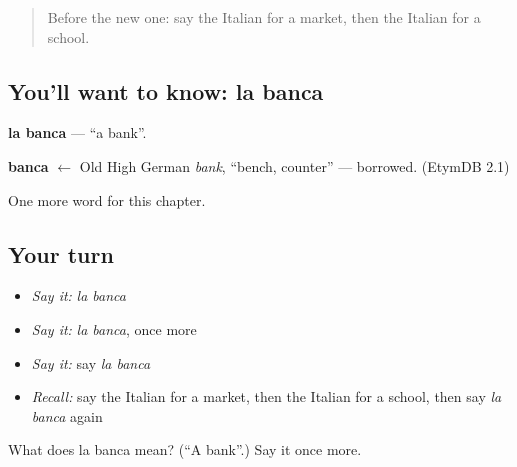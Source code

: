 \begin{quote}
Before the new one: say the Italian for a market, then the Italian for a school.
\end{quote}

\subsection*{You'll want to know: la banca}
\textbf{la banca} — \textquotedblleft{}a bank\textquotedblright{}.

\begin{cousinweb}
\textbf{banca} $\leftarrow$ Old High German \emph{bank}, \textquotedblleft{}bench, counter\textquotedblright{} — borrowed. (EtymDB 2.1)
\end{cousinweb}

\begin{grammarlens}[title={What you've built}]
One more word for this chapter.
\end{grammarlens}

\subsection*{Your turn}
\begin{itemize}
\raggedright
  \item \emph{Say it:} \emph{la banca}
  \item \emph{Say it:} \emph{la banca}, once more
  \item \emph{Say it:} say \emph{la banca}
  \item \emph{Recall:} say the Italian for a market, then the Italian for a school, then say \emph{la banca} again
\end{itemize}

\begin{tcolorbox}[breakable,colback=teal!4,colframe=teal!35!black,title={Before you move on}]
What does la banca mean? (\textquotedblleft{}A bank\textquotedblright{}.) Say it once more.
\end{tcolorbox}
